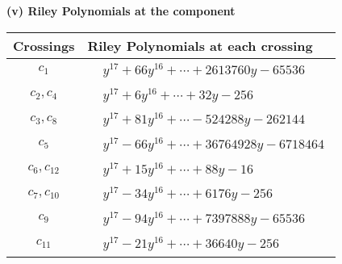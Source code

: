 \documentclass[1p]{elsarticle_modified}
\theoremstyle{definition}
\begin{document}
\newpage\renewcommand{\arraystretch}{1}
\flushleft \textbf{(v) Riley Polynomials at the component}\newline \\
\begin{tabular}{m{50pt}|m{274pt}}
Crossings & \hspace{64pt}Riley Polynomials at each crossing \\
\hline $$\begin{aligned}c_{1}\end{aligned}$$&$\begin{aligned}
&y^{17}+66 y^{16}+\cdots+2613760 y-65536
\end{aligned}$\\
\hline $$\begin{aligned}c_{2},c_{4}\end{aligned}$$&$\begin{aligned}
&y^{17}+6 y^{16}+\cdots+32 y-256
\end{aligned}$\\
\hline $$\begin{aligned}c_{3},c_{8}\end{aligned}$$&$\begin{aligned}
&y^{17}+81 y^{16}+\cdots-524288 y-262144
\end{aligned}$\\
\hline $$\begin{aligned}c_{5}\end{aligned}$$&$\begin{aligned}
&y^{17}-66 y^{16}+\cdots+36764928 y-6718464
\end{aligned}$\\
\hline $$\begin{aligned}c_{6},c_{12}\end{aligned}$$&$\begin{aligned}
&y^{17}+15 y^{16}+\cdots+88 y-16
\end{aligned}$\\
\hline $$\begin{aligned}c_{7},c_{10}\end{aligned}$$&$\begin{aligned}
&y^{17}-34 y^{16}+\cdots+6176 y-256
\end{aligned}$\\
\hline $$\begin{aligned}c_{9}\end{aligned}$$&$\begin{aligned}
&y^{17}-94 y^{16}+\cdots+7397888 y-65536
\end{aligned}$\\
\hline $$\begin{aligned}c_{11}\end{aligned}$$&$\begin{aligned}
&y^{17}-21 y^{16}+\cdots+36640 y-256
\end{aligned}$\\
\hline
\end{tabular}\\~\\
\end{document}
